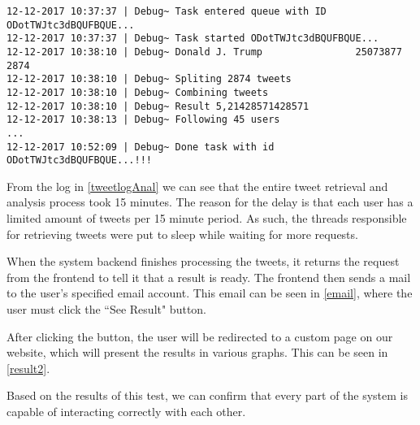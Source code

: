 
\begin{minipage}[H]{\linewidth}
\begin{lstlisting}[caption = Log from tweet retrieval and analysis, label = tweetlogAnal] 
12-12-2017 10:37:37 | Debug~ Task entered queue with ID ODotTWJtc3dBQUFBQUE...
12-12-2017 10:37:37 | Debug~ Task started ODotTWJtc3dBQUFBQUE...
12-12-2017 10:38:10 | Debug~ Donald J. Trump                25073877             2874       
12-12-2017 10:38:10 | Debug~ Spliting 2874 tweets
12-12-2017 10:38:10 | Debug~ Combining tweets
12-12-2017 10:38:10 | Debug~ Result 5,21428571428571
12-12-2017 10:38:13 | Debug~ Following 45 users
...
12-12-2017 10:52:09 | Debug~ Done task with id ODotTWJtc3dBQUFBQUE...!!!
\end{lstlisting}
\end{minipage}

From the log in \autoref{tweetlogAnal} we can see that the entire tweet
retrieval and analysis process took 15 minutes. The reason for the delay is that
each user has a limited amount of tweets per 15 minute period. As such, the
threads responsible for retrieving tweets were put to sleep while waiting for
more requests.\nl

When the system backend finishes processing the tweets, it returns the request
from the frontend to tell it that a result is ready. The frontend then sends a
mail to the user's specified email account. This email can be seen in
\autoref{email}, where the user must click the ``See Result" button.\nl


After clicking the button, the user will be redirected to a custom page on our
website, which will present the results in various graphs. This can be seen in
\autoref{result2}.\nl


Based on the results of this test, we can confirm that every part of the system
is capable of interacting correctly with each other.





